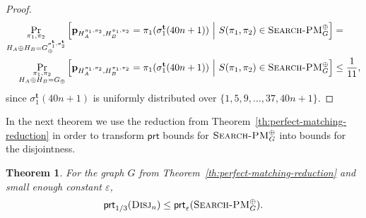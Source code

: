 \documentclass[11pt]{article}
\newcommand{\scterm}[1]{{\textrm{\sc #1}}}
\newcommand{\prt}{\mathsf{prt}}
\newcommand{\disj}{\scterm{Disj}}
\newcommand{\xorPM}{\textsc{Search-PM}^\oplus}
\numberwithin{equation}{section}
\newtheorem{theorem}{Theorem}[section]
\begin{document}
\begin{proof}
\[\begin{aligned}
 \Pr_{\substack{\pi_1,\pi_2 \\ H_A \oplus H_B = G_\oplus^{\sigma_1^{\mathbf{t}},\sigma_2^{\mathbf{t}}}}}
&\left[ \mathbf{p}_{H_A^{\pi_1 ,\pi_2 },H_B^{\pi_1,\pi_2}} = \pi_1(\sigma_1^{\mathbf{t}}(40n+1))\ \middle|\ S(\pi_1,\pi_2) \in \xorPM_G \right] = \\
\Pr_{\substack{\pi_1,\pi_2 \\ H_A \oplus H_B = G_\oplus}}
&\left[ \mathbf{p}_{H_A^{\pi_1 ,\pi_2 },H_B^{\pi_1,\pi_2}} = \pi_1(\sigma_1^{\mathbf{t}}(40n+1))\ \middle|\ S(\pi_1,\pi_2) \in \xorPM_G \right] \leq \frac{1}{11},
\end{aligned}
\]
since $\sigma_1^{\mathbf{t}}(40n+1)$ is uniformly distributed over $\{1, 5, 9, \dotsc, 37, 40n+1\}$.
\end{proof}

In the next theorem we use the reduction from Theorem~\ref{th:perfect-matching-reduction}
in order to transform $\prt$ bounds for $\xorPM_G$ into bounds for the disjointness.
\begin{theorem} \label{th:PM-to-disj}
For the graph $G$ from Theorem~\ref{th:perfect-matching-reduction} and small enough constant $\varepsilon$, \[\prt_{1/3}(\disj_n) \le \prt_\varepsilon(\xorPM_G). \]
\end{theorem}
\end{document}
